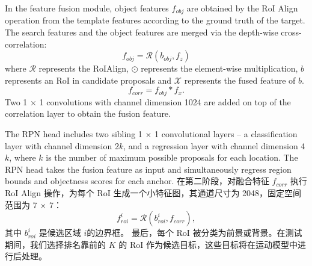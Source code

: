 In the feature fusion module, object features $f_{obj}$ are obtained by the RoI Align operation from the template features according to the ground truth of the target. The search features and the object features are merged via the depth-wise cross-correlation:
\begin{equation}
    f_{obj} = \mathcal{R}(b_{obj}, f_{z})
\end{equation}
where $\mathcal{R}$ represents the RoIAlign, $\odot$ represents the element-wise multiplication, $b$ represents an RoI in candidate proposals and $\mathcal{X}$ represents the fused feature of $b$.
\begin{equation}
    f_{corr} = f_{obj} * f_{x}.
\end{equation}
Two 1 $\times$ 1 convolutions with channel dimension 1024 are added on top of the correlation layer to obtain the fusion feature.

The RPN head includes two sibling 1 $\times$ 1 convolutional layers -- a classification layer with channel dimension 2$k$, and a regression layer with channel dimension 4$k$, where $k$ is the number of maximum possible proposals for each location. The RPN head takes the fusion feature as input and simultaneously regress region bounds and objectness scores for each anchor.
\fi
在第二阶段，对融合特征 $f_{corr}$ 执行 RoI Align 操作，为每个 RoI 生成一个小特征图，其通道尺寸为 2048，固定空间范围为 7 $\times$ 7：
\begin{equation}
    f_{roi}^{i} = \mathcal{R}(b_{roi}^{i}, f_{corr}),
\end{equation}
其中 $b_{roi}^{i}$ 是候选区域 $i$的边界框。
最后，每个 RoI 被分类为前景或背景。在测试期间，我们选择排名靠前的 $K$ 的 RoI 作为候选目标，这些目标将在运动模型中进行后处理。


